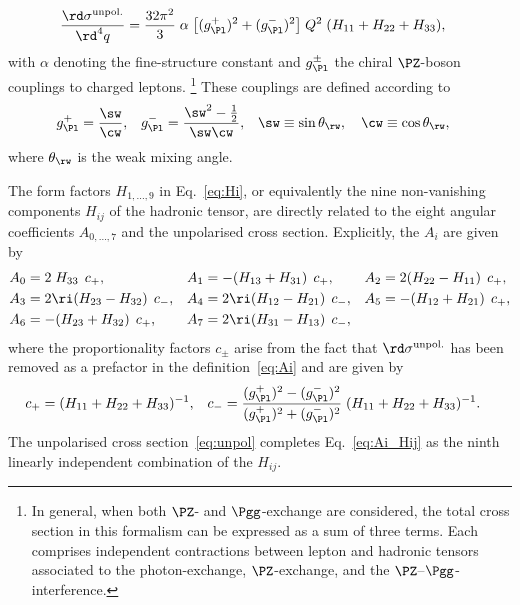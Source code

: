 \begin{align}
  \frac{\rd\sigma^\mathrm{unpol.}}{\rd^4q}
  &= \frac{32\pi^2}{3} \; \alpha \;\bigl[ (g_\Pl^+)^2+(g_\Pl^-)^2 \bigr]
  \; Q^2 \;
  (H_{11}+H_{22}+H_{33}) ,
  \label{eq:unpol}
\end{align}
with $\alpha$ denoting the fine-structure constant and $g_\Pl^{\pm}$ the chiral $\PZ$-boson couplings to charged leptons.%
\footnote{
  In general, when both $\PZ$- and $\Pgg$-exchange are considered, the total cross section in this formalism can be expressed as a sum of three terms.
  Each comprises independent contractions between lepton and hadronic tensors associated to the photon-exchange, $\PZ$-exchange, and the $\PZ$--$\Pgg$-interference.
}
These couplings are defined according to
\begin{align}
  g_\Pl^+ &= \frac{\sw}{\cw} , &
  g_\Pl^- &= \frac{\sw^2-\frac{1}{2}}{\sw\cw} , &
  \sw &\equiv \sin\theta_\rw, \quad
  \cw \equiv \cos\theta_\rw ,
\end{align}
where $\theta_\rw$ is the weak mixing angle.

The form factors $H_{1,\ldots,9}$ in Eq.~\eqref{eq:Hi}, or equivalently the nine non-vanishing components $H_{ij}$ of the hadronic tensor, are directly related to the eight angular coefficients $A_{0,\ldots,7}$ and the unpolarised cross section.
Explicitly, the $A_i$ are given by
\begin{align}
  A_0 &= 2 \; H_{33}            \,\;c_{+}, &
  A_1 &= - (H_{13}+H_{31})      \,\;c_{+}, & %
  A_2 &= 2 (H_{22}-H_{11})      \,\;c_{+}, \nonumber \\ 
  A_3 &= 2 \ri (H_{23}-H_{32})  \,\;c_{-}, & %
  A_4 &= 2 \ri (H_{12}-H_{21})  \,\;c_{-}, & %
  A_5 &= - (H_{12}+H_{21})      \,\;c_{+}, \nonumber \\ 
  A_6 &= - (H_{23}+H_{32})      \,\;c_{+}, & %
  A_7 &= 2 \ri (H_{31}-H_{13})  \,\;c_{-},
  \label{eq:Ai_Hij}
\end{align}
where the proportionality factors $c_{\pm}$ arise from the fact that $\rd\sigma^\mathrm{unpol.}$ has been removed as a prefactor in the definition~\eqref{eq:Ai} and are given by
\begin{align}
  c_+ &= (H_{11}+H_{22}+H_{33})^{-1} , &
  c_- &= \frac{(g_\Pl^+)^2-(g_\Pl^-)^2}{(g_\Pl^+)^2+(g_\Pl^-)^2} \; (H_{11}+H_{22}+H_{33})^{-1} .
\end{align}
The unpolarised cross section~\eqref{eq:unpol} completes Eq.~\eqref{eq:Ai_Hij} as the ninth linearly independent combination of the $H_{ij}$.

